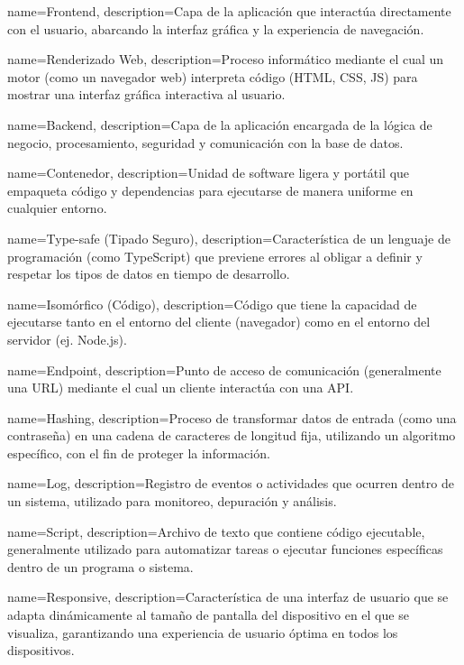 
{
    name=Frontend,
    description={Capa de la aplicación que interactúa directamente con el usuario, abarcando la interfaz gráfica y la experiencia de navegación.}
}

{
    name=Renderizado Web,
    description={Proceso informático mediante el cual un motor (como un navegador web) interpreta código (HTML, CSS, JS) para mostrar una interfaz gráfica interactiva al usuario.}
}

{
    name=Backend,
    description={Capa de la aplicación encargada de la lógica de negocio, procesamiento, seguridad y comunicación con la base de datos.}
}


{
    name=Contenedor,
    description={Unidad de software ligera y portátil que empaqueta código y dependencias para ejecutarse de manera uniforme en cualquier entorno.}
}

{
    name=Type-safe (Tipado Seguro),
    description={Característica de un lenguaje de programación (como TypeScript) que previene errores al obligar a definir y respetar los tipos de datos en tiempo de desarrollo.}
}

{
    name=Isomórfico (Código),
    description={Código que tiene la capacidad de ejecutarse tanto en el entorno del cliente (navegador) como en el entorno del servidor (ej. Node.js).}
}

{
    name=Endpoint,
    description={Punto de acceso de comunicación (generalmente una URL) mediante el cual un cliente interactúa con una API.}
}

{
    name=Hashing,
    description={Proceso de transformar datos de entrada (como una contraseña) en una cadena de caracteres de longitud fija, utilizando un algoritmo específico, con el fin de proteger la información.}
}

{
    name=Log,
    description={Registro de eventos o actividades que ocurren dentro de un sistema, utilizado para monitoreo, depuración y análisis.}
}

{
    name=Script,
    description={Archivo de texto que contiene código ejecutable, generalmente utilizado para automatizar tareas o ejecutar funciones específicas dentro de un programa o sistema.}
}

{
    name=Responsive,
    description={Característica de una interfaz de usuario que se adapta dinámicamente al tamaño de pantalla del dispositivo en el que se visualiza, garantizando una experiencia de usuario óptima en todos los dispositivos.}
}